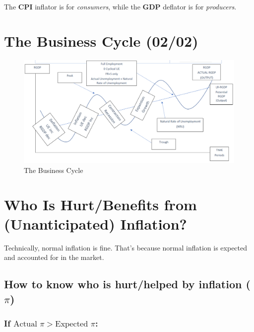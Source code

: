 \documentclass[
  letterpaper,
  DIV=11,
  numbers=noendperiod]{scrartcl}
\begin{document}
The \textbf{CPI} inflator is for \emph{consumers}, while the
\textbf{GDP} deflator is for \emph{producers}.

\section{The Business Cycle (02/02)}\label{the-business-cycle-0202}

\begin{figure}[H]

{\centering \includegraphics[width=1\textwidth,height=\textheight]{img/business-cycle.png}

}

\caption{The Business Cycle}

\end{figure}%

\section{Who Is Hurt/Benefits from (Unanticipated)
Inflation?}\label{who-is-hurtbenefits-from-unanticipated-inflation}

Technically, normal inflation is fine. That's because normal inflation
is expected and accounted for in the market.

\subsection{\texorpdfstring{How to know who is hurt/helped by inflation
(\(\pi\))}{How to know who is hurt/helped by inflation (\textbackslash pi)}}\label{how-to-know-who-is-hurthelped-by-inflation-pi}

\subsubsection{\texorpdfstring{If
\(\text{Actual } π > \text{Expected } \pi\):}{If \textbackslash text\{Actual \} π \textgreater{} \textbackslash text\{Expected \} \textbackslash pi:}}\label{if-textactual-ux3c0-textexpected-pi}
\end{document}
